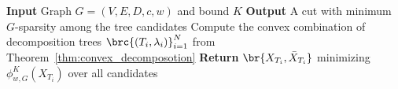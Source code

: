 \begin{algorithm}[tbp]
    \caption{Generalized sparsest $K$-bounded cut via tree decomposition}
    \textbf{Input} Graph $G=(V,E,D,c,w)$ and bound $K$\;
    \textbf{Output} A cut with minimum $G$-sparsity among the tree candidates\;
    Compute the convex combination of decomposition trees $\brc{(T_i,\lambda_i)}_{i=1}^{N}$ from Theorem~\ref{thm:convex_decomposotion}\;
    \textbf{Return} $\br{X_{T_i},\bar{X}_{T_i}}$ minimizing $\phi_{w,G}^K(X_{T_i})$ over all candidates\;
\end{algorithm}
